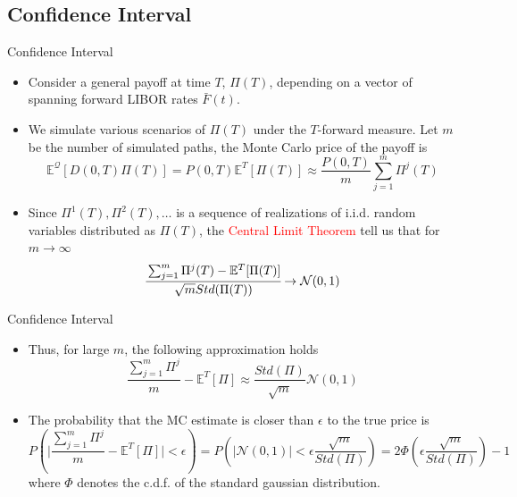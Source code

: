 \documentclass{beamer}
\begin{document}
\subsection{Confidence Interval}
\begin{frame}{Confidence Interval}
  \begin{itemize}
  \item<1-> Consider a general payoff at time $T$, $\Pi(T)$, depending on a vector of spanning forward LIBOR rates $\bar{F}(t)$. %
  \item<2-> We simulate various scenarios of $\Pi(T)$ under the $T$-forward measure. Let $m$ be the number of simulated paths, the Monte Carlo price of the payoff is
    \begin{equation*}
      \mathbb{E}^\mathcal{Q}[D(0,T)\Pi(T)] = P(0,T)\mathbb{E}^T[\Pi(T)]\approx \frac{P(0,T)}{m}\sum_{j=1}^{m}\Pi^j(T)
    \end{equation*}
  \item<3-> Since $\Pi^1(T), \Pi^2(T),\ldots$ is a sequence of realizations of i.i.d. random variables distributed as $\Pi(T)$, the \textcolor{red}{Central Limit Theorem} tell us that for $m\rightarrow\infty$
    \begin{equation*}
      \cfrac{\sum_{j=1}^{m}\Pi^j(T)-\mathbb{E}^T[\Pi(T)]}{\sqrt{m} Std(\Pi(T))}\rightarrow \mathcal{N}(0,1)
    \end{equation*}
  \end{itemize}
\end{frame}

\begin{frame}{Confidence Interval}
  \begin{itemize}
  \item<1-> Thus, for large $m$, the following approximation holds
    \begin{equation*}
      \frac{\sum_{j=1}^{m}\Pi^j}{m}-\mathbb{E}^T[\Pi]\approx \frac{Std(\Pi)}{\sqrt{m}}\mathcal{N}(0,1)
    \end{equation*}
  \item<2-> The probability that the MC estimate is closer than $\epsilon$ to the true price is
    \begin{equation*}
      P\left(\bigg|\frac{\sum_{j=1}^m\Pi^j}{m}-\mathbb{E}^T[\Pi]\bigg|<\epsilon\right) = P\left(|\mathcal{N}(0,1)|<\epsilon\frac{\sqrt{m}}{Std(\Pi)}\right) =
      2\Phi\left(\epsilon\frac{\sqrt{m}}{Std(\Pi)}\right)-1
    \end{equation*}
    where $\Phi$ denotes the c.d.f. of the standard gaussian distribution.
  \end{itemize}
\end{frame}
\end{document}
